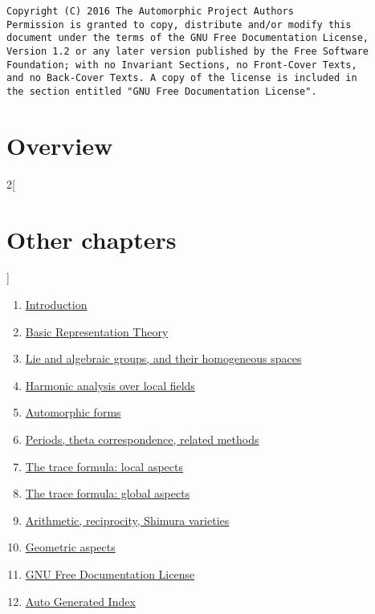 \documentclass[oneside]{stacks-project-book}
\theoremstyle{plain}
\theoremstyle{definition}
\theoremstyle{remark}
\numberwithin{equation}{subsection}
\begin{document}
\label{arithmetic-section-phantom}
\hypertarget{0800}{}
\reversemarginpar{}

\begin{verbatim}
Copyright (C) 2016 The Automorphic Project Authors
Permission is granted to copy, distribute and/or modify this
document under the terms of the GNU Free Documentation License,
Version 1.2 or any later version published by the Free Software
Foundation; with no Invariant Sections, no Front-Cover Texts,
and no Back-Cover Texts. A copy of the license is included in
the section entitled "GNU Free Documentation License".
\end{verbatim}



\section{Overview}
\label{arithmetic-section-overview}
\hypertarget{0801}{}
\reversemarginpar{}



\begin{multicols}{2}[\section{Other chapters}]
\noindent
\begin{enumerate}
\item \hyperref[introduction-section-phantom]{Introduction}
\item \hyperref[representationtheory-section-phantom]{Basic Representation Theory}
\item \hyperref[algebraicgroups-section-phantom]{Lie and algebraic groups, and their homogeneous spaces}
\item \hyperref[harmonicanalysis-section-phantom]{Harmonic analysis over local fields}
\item \hyperref[automorphicforms-section-phantom]{Automorphic forms}
\item \hyperref[periods-section-phantom]{Periods, theta correspondence, related methods}
\item \hyperref[traceformulalocal-section-phantom]{The trace formula: local aspects}
\item \hyperref[traceformulaglobal-section-phantom]{The trace formula: global aspects}
\item \hyperref[arithmetic-section-phantom]{Arithmetic, reciprocity, Shimura varieties}
\item \hyperref[geometric-section-phantom]{Geometric aspects}
\item \hyperref[fdl-section-phantom]{GNU Free Documentation License}
\item \hyperref[index-section-phantom]{Auto Generated Index}
\end{enumerate}
\end{multicols}
\end{document}
